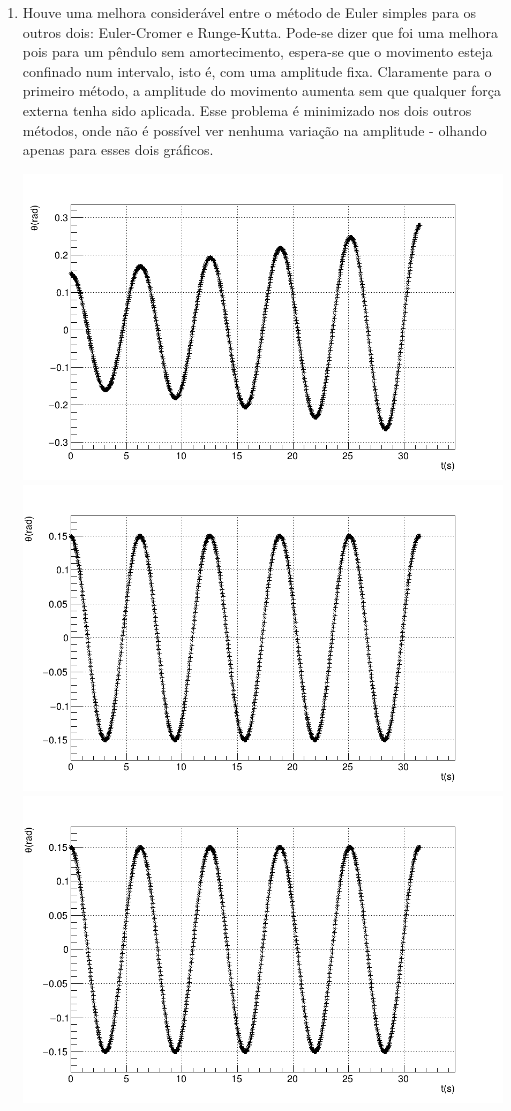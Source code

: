\documentclass[main.tex]{subfiles}
\begin{document}
\begin{enumerate}[label=\textbf{\alph*)}]
    \item Houve uma melhora considerável entre o método de Euler simples para os outros dois: Euler-Cromer e Runge-Kutta. Pode-se dizer que foi uma melhora pois para um pêndulo sem amortecimento, espera-se que o movimento esteja confinado num intervalo, isto é, com uma amplitude fixa. Claramente para o primeiro método, a amplitude do movimento aumenta sem que qualquer força externa tenha sido aplicada.
    Esse problema é minimizado nos dois outros métodos, onde não é possível ver nenhuma variação na amplitude - olhando apenas para esses dois gráficos.
    \begin{center}
        \includegraphics[scale=0.15]{../q1/plots/theta_t_euler.png}
        \includegraphics[scale=0.15]{../q1/plots/theta_t_ec.png}
        \includegraphics[scale=0.15]{../q1/plots/theta_t_RK.png}

\end{center}
\end{enumerate}
\end{document}
